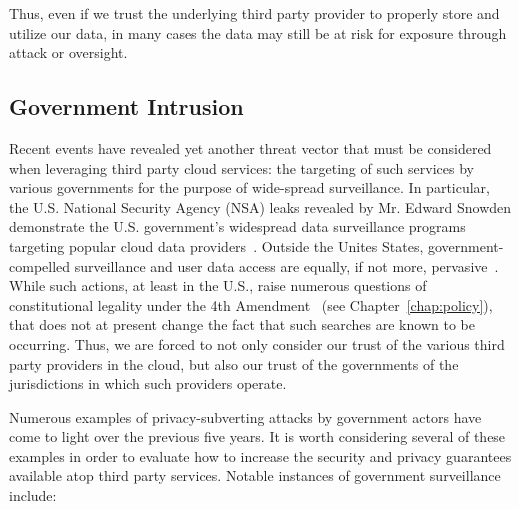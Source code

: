 Thus, even if we trust the underlying third party provider to properly
store and utilize our data, in many cases the data may still be at
risk for exposure through attack or oversight.

\subsection{Government Intrusion}

Recent events have revealed yet another threat vector that must be
considered when leveraging third party cloud services: the targeting
of such services by various governments for the purpose of wide-spread
surveillance. In particular, the U.S. National Security Agency (NSA)
leaks revealed by Mr. Edward Snowden demonstrate the U.S. government's
widespread data surveillance programs targeting popular cloud data
providers~\cite{greenwald-prism}.  Outside the Unites States,
government-compelled surveillance and user data access are equally, if
not more, pervasive~\cite{netfreedom2015}.  While such actions, at
least in the U.S., raise numerous questions of constitutional legality
under the 4th Amendment~\cite{us-constitution-amend4} (see
Chapter~\ref{chap:policy}), that does not at present change the fact
that such searches are known to be occurring. Thus, we are forced to
not only consider our trust of the various third party providers in
the cloud, but also our trust of the governments of the jurisdictions
in which such providers operate.

Numerous examples of privacy-subverting attacks by government actors
have come to light over the previous five years. It is worth
considering several of these examples in order to evaluate how to
increase the security and privacy guarantees available atop third
party services. Notable instances of government surveillance include:

